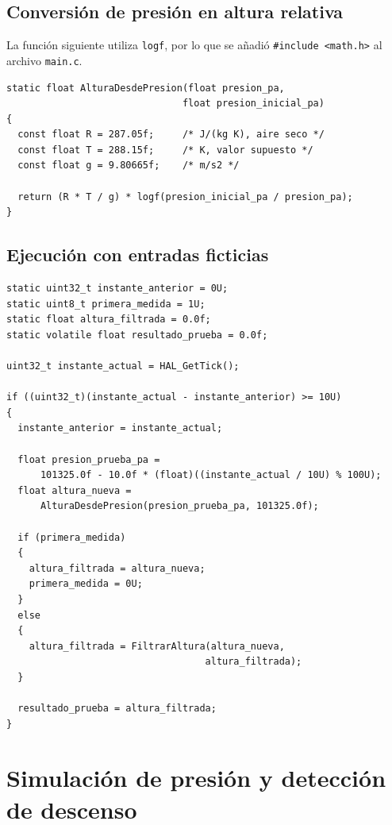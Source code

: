 \documentclass[11pt,a4paper]{article}
\begin{document}
\subsection{Conversión de presión en altura relativa}

La función siguiente utiliza \texttt{logf}, por lo que se añadió
\texttt{\#include <math.h>} al archivo \texttt{main.c}.

\begin{lstlisting}[caption={Conversión aproximada de presión a altura relativa.},
label={lst:presion_altura}]
static float AlturaDesdePresion(float presion_pa,
                               float presion_inicial_pa)
{
  const float R = 287.05f;     /* J/(kg K), aire seco */
  const float T = 288.15f;     /* K, valor supuesto */
  const float g = 9.80665f;    /* m/s2 */

  return (R * T / g) * logf(presion_inicial_pa / presion_pa);
}
\end{lstlisting}

\subsection{Ejecución con entradas ficticias}

\begin{lstlisting}[caption={Generación de presión ficticia, conversión
y filtrado de altura.},label={lst:prueba_altura}]
static uint32_t instante_anterior = 0U;
static uint8_t primera_medida = 1U;
static float altura_filtrada = 0.0f;
static volatile float resultado_prueba = 0.0f;

uint32_t instante_actual = HAL_GetTick();

if ((uint32_t)(instante_actual - instante_anterior) >= 10U)
{
  instante_anterior = instante_actual;

  float presion_prueba_pa =
      101325.0f - 10.0f * (float)((instante_actual / 10U) % 100U);
  float altura_nueva =
      AlturaDesdePresion(presion_prueba_pa, 101325.0f);

  if (primera_medida)
  {
    altura_filtrada = altura_nueva;
    primera_medida = 0U;
  }
  else
  {
    altura_filtrada = FiltrarAltura(altura_nueva,
                                   altura_filtrada);
  }

  resultado_prueba = altura_filtrada;
}
\end{lstlisting}
\section{Simulación de presión y detección de descenso}%
\label{anexo:simulacion_descenso}
\end{document}
